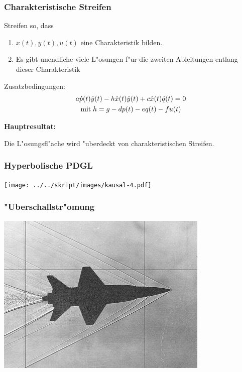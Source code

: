 \begin{frame}
\frametitle{Charakteristische Streifen}
Streifen so, dass
\begin{enumerate}
\item
$x(t), y(t), u(t)$ eine Charakteristik bilden.
\item
Es gibt unendliche viele L"osungen f"ur die zweiten Ableitungen entlang
dieser Charakteristik
\end{enumerate}

Zusatzbedingungen:
\begin{gather*}
a\dot p(t)\dot y(t)
-
h \dot x(t) \dot y(t)
+
c \dot x(t)\dot q(t)=0
\\
\text{mit\;}
h=g-dp(t)-eq(t)-fu(t)
\end{gather*}

\bigskip

{\bf Hauptresultat:}
\medskip

\begin{theorem}
Die L"osungsfl"ache wird "uberdeckt von charakteristischen Streifen.
\end{theorem}

\end{frame}

\begin{frame}
\frametitle{Hyperbolische PDGL}
\begin{center}
\texttt{[image: ../../skript/images/kausal-4.pdf]}
\end{center}
\end{frame}

\begin{frame}
\frametitle{"Uberschallstr"omung}
\begin{center}
\includegraphics[width=\hsize]{../../skript/graphics/i-5-1.jpg}
\end{center}
\end{frame}

